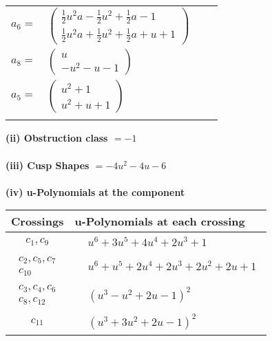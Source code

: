 \documentclass[1p]{elsarticle_modified}
\theoremstyle{definition}
\begin{document}
\begin{tabular}{m{7pt} m{180pt} m{7pt} m{180pt} }
\flushright $a_{6}=$&$\begin{pmatrix}\frac{1}{2} u^2 a-\frac{1}{2} u^2+\frac{1}{2} a-1\\\frac{1}{2} u^2 a+\frac{1}{2} u^2+\frac{1}{2} a+u+1\end{pmatrix}$ \\
\flushright $a_{8}=$&$\begin{pmatrix}u\\- u^2- u-1\end{pmatrix}$ \\
\flushright $a_{5}=$&$\begin{pmatrix}u^2+1\\u^2+u+1\end{pmatrix}$\\&\end{tabular}
\flushleft \textbf{(ii) Obstruction class $= -1$}\\~\\
\flushleft \textbf{(iii) Cusp Shapes $= -4 u^2-4 u-6$}\\~\\
\newpage\renewcommand{\arraystretch}{1}
\flushleft \textbf{(iv) u-Polynomials at the component}\newline \\
\begin{tabular}{m{50pt}|m{274pt}}
Crossings & \hspace{64pt}u-Polynomials at each crossing \\
\hline $$\begin{aligned}c_{1},c_{9}\end{aligned}$$&$\begin{aligned}
&u^6+3 u^5+4 u^4+2 u^3+1
\end{aligned}$\\
\hline $$\begin{aligned}c_{2},c_{5},c_{7}\\c_{10}\end{aligned}$$&$\begin{aligned}
&u^6+u^5+2 u^4+2 u^3+2 u^2+2 u+1
\end{aligned}$\\
\hline $$\begin{aligned}c_{3},c_{4},c_{6}\\c_{8},c_{12}\end{aligned}$$&$\begin{aligned}
&(u^3- u^2+2 u-1)^2
\end{aligned}$\\
\hline $$\begin{aligned}c_{11}\end{aligned}$$&$\begin{aligned}
&(u^3+3 u^2+2 u-1)^2
\end{aligned}$\\
\hline
\end{tabular}\\~\\
\end{document}
